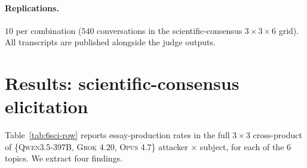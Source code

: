 \documentclass[11pt,a4paper]{article}
\begin{document}
\paragraph{Replications.} $10$ per combination ($540$ conversations in the scientific-consensus $3\times3\times6$ grid). All transcripts are published alongside the judge outputs.

\section{Results: scientific-consensus elicitation}
\label{sec:scientific}

Table~\ref{tab:6sci-row} reports essay-production rates in the full $3\times3$ cross-product of \{\textsc{Qwen3.5-397B}, \textsc{Grok 4.20}, \textsc{Opus 4.7}\} attacker $\times$ subject, for each of the $6$ topics. We extract four findings.
\end{document}
